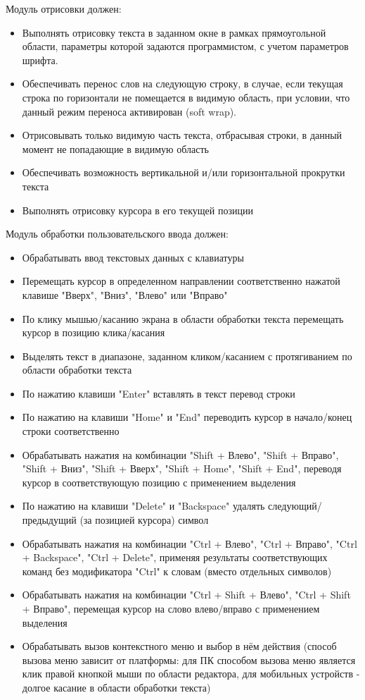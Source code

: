 \documentclass{fefu}
\begin{document}
		\par Модуль отрисовки должен:
		\begin{itemize}
			\item Выполнять отрисовку текста в заданном окне в рамках прямоугольной области, 
			параметры которой задаются программистом, с учетом параметров шрифта.
			\item Обеспечивать перенос слов на следующую строку, в случае, если
			текущая строка по горизонтали не помещается в видимую область, при условии, что 
			данный режим переноса активирован (soft wrap).
			\item Отрисовывать только видимую часть текста, отбрасывая строки, в данный момент
			не попадающие в видимую область
			\item Обеспечивать возможность вертикальной и/или горизонтальной прокрутки 
			текста
			\item Выполнять отрисовку курсора в его текущей позиции
		\end{itemize}
		\par Модуль обработки пользовательского ввода должен:
		\begin{itemize}
			\item Обрабатывать ввод текстовых данных с клавиатуры
			\item Перемещать курсор в определенном направлении соответственно нажатой 
			клавише "Вверх", "Вниз", "Влево" или "Вправо"
			\item По клику мышью/касанию экрана в области обработки текста перемещать курсор
			в позицию клика/касания
			\item Выделять текст в диапазоне, заданном кликом/касанием с протягиванием по
			области обработки текста
			\item По нажатию клавиши "Enter" вставлять в текст перевод строки
			\item По нажатию на клавиши "Home" и "End" переводить курсор в начало/конец строки
			соответственно
			\item Обрабатывать нажатия на комбинации "Shift + Влево", "Shift + Вправо", 
			"Shift + Вниз", "Shift + Вверх", "Shift + Home", "Shift + End", переводя курсор
			в соответствующую позицию с применением выделения
			\item По нажатию на клавиши "Delete" и "Backspace" удалять следующий/предыдущий
			(за позицией курсора) символ
			\item Обрабатывать нажатия на комбинации "Ctrl + Влево", "Ctrl + Вправо", 
			"Ctrl + Backspace", "Ctrl + Delete", применяя результаты соответствующих команд без
			модификатора "Ctrl" к словам (вместо отдельных символов)
			\item Обрабатывать нажатия на комбинации "Ctrl + Shift + Влево", 
			"Ctrl + Shift + Вправо", перемещая курсор на слово влево/вправо с применением
			выделения
			\item Обрабатывать вызов контекстного меню и выбор в нём действия (способ вызова
			меню зависит от платформы: для ПК способом вызова меню является клик правой
			кнопкой мыши по области редактора, для мобильных устройств - долгое касание в 
			области обработки текста)
		\end{itemize}
\end{document}
